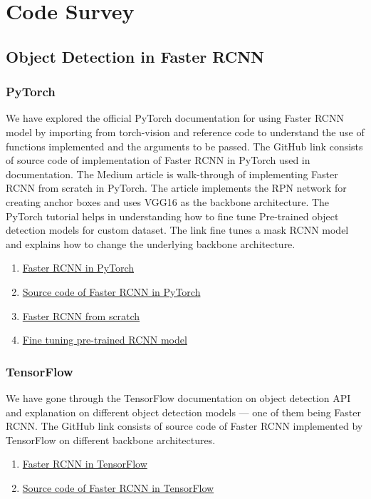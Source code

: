 \documentclass[12pt, a4paper, twoside]{article}
\begin{document}
\section{Code Survey}
\subsection{Object Detection in Faster RCNN}
\subsubsection{PyTorch}
We have explored the official PyTorch documentation for using Faster RCNN model by importing from torch-vision and reference code to understand the use of functions implemented and the arguments to be passed. The GitHub link consists of source code of implementation of Faster RCNN in PyTorch used in documentation. The Medium article is walk-through of implementing Faster RCNN from scratch in PyTorch. The article implements the RPN network for creating anchor boxes and uses VGG16 as the backbone architecture. The PyTorch tutorial helps in understanding how to fine tune Pre-trained object detection models for custom dataset. The link fine tunes a mask RCNN model and explains how to change the underlying backbone architecture.
\begin{enumerate}
	\item \href{https://pytorch.org/vision/main/models/faster_rcnn.html}{Faster RCNN in PyTorch}
	\item \href{https://github.com/pytorch/vision/blob/main/torchvision/models/detection/faster_rcnn.py}{Source code of Faster RCNN in PyTorch}
	\item \href{https://medium.com/@fractal.ai/guide-to-build-faster-rcnn-in-pytorch-42d47cb0ecd3}{Faster RCNN from scratch}
	\item \href{https://pytorch.org/tutorials/intermediate/torchvision_tutorial.html}{Fine tuning pre-trained RCNN model}
\end{enumerate}

\subsubsection{TensorFlow}
We have gone through the TensorFlow documentation on object detection API and explanation on different object detection models --- one of them being Faster RCNN. The GitHub link consists of source code of Faster RCNN implemented by TensorFlow on different backbone architectures.
\begin{enumerate}
	\item \href{https://www.tensorflow.org/hub/tutorials/object_detection}{Faster RCNN in TensorFlow}
	\item \href{https://github.com/tensorflow/models/blob/master/research/object_detection/models/faster_rcnn_pnas_feature_extractor_tf1_test.py
	}{Source code of Faster RCNN in TensorFlow}
\end{enumerate}
\end{document}
